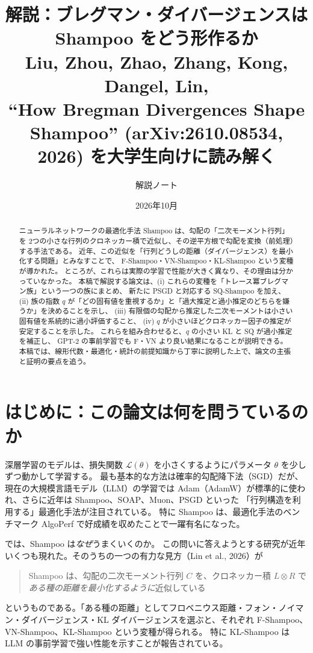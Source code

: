 \documentclass[a4paper,11pt]{ltjsarticle}
\title{\textbf{解説：ブレグマン・ダイバージェンスは Shampoo をどう形作るか}\\[2mm]
\large Liu, Zhou, Zhao, Zhang, Kong, Dangel, Lin,\\
``How Bregman Divergences Shape Shampoo'' (arXiv:2610.08534, 2026) を大学生向けに読み解く}
\author{解説ノート}
\date{2026年10月}
\theoremstyle{definition}
\theoremstyle{plain}
\begin{document}
\maketitle

\begin{abstract}
ニューラルネットワークの最適化手法 Shampoo は、勾配の「二次モーメント行列」を
2つの小さな行列のクロネッカー積で近似し、その逆平方根で勾配を変換（前処理）する手法である。
近年、この近似を「行列どうしの距離（ダイバージェンス）を最小化する問題」とみなすことで、
F-Shampoo・VN-Shampoo・KL-Shampoo という変種が導かれた。
ところが、これらは実際の学習で性能が大きく異なり、その理由は分かっていなかった。
本稿で解説する論文は、(i) これらの変種を「トレース冪ブレグマン族」という一つの族にまとめ、
新たに PSGD と対応する SQ-Shampoo を加え、
(ii) 族の指数 $q$ が「どの固有値を重視するか」と「過大推定と過小推定のどちらを嫌うか」を決めることを示し、
(iii) 有限個の勾配から推定した二次モーメントは小さい固有値を系統的に過小評価すること、
(iv) $q$ が小さいほどクロネッカー因子の推定が安定することを示した。
これらを組み合わせると、$q$ の小さい KL と SQ が過小推定を補正し、
GPT-2 の事前学習でも F・VN より良い結果になることが説明できる。
本稿では、線形代数・最適化・統計の前提知識から丁寧に説明した上で、論文の主張と証明の要点を追う。
\end{abstract}

\tableofcontents
\clearpage

\section{はじめに：この論文は何を問うているのか}

深層学習のモデルは、損失関数 $\mathcal{L}(\theta)$ を小さくするようにパラメータ $\theta$ を少しずつ動かして学習する。
最も基本的な方法は確率的勾配降下法（SGD）だが、現在の大規模言語モデル（LLM）の学習では
Adam（AdamW）が標準的に使われ、さらに近年は Shampoo、SOAP、Muon、PSGD といった
「行列構造を利用する」最適化手法が注目されている。
特に Shampoo は、最適化手法のベンチマーク AlgoPerf で好成績を収めたことで一躍有名になった。

では、Shampoo は\emph{なぜ}うまくいくのか。
この問いに答えようとする研究が近年いくつも現れた。そのうちの一つの有力な見方（Lin et al., 2026）が
\begin{quote}
Shampoo は、勾配の二次モーメント行列 $C$ を、クロネッカー積 $L\otimes R$ で
\emph{ある種の距離を最小化するように}近似している
\end{quote}
というものである。「ある種の距離」としてフロベニウス距離・フォン・ノイマン・ダイバージェンス・KL ダイバージェンスを選ぶと、それぞれ
F-Shampoo、VN-Shampoo、KL-Shampoo という変種が得られる。
特に KL-Shampoo は LLM の事前学習で強い性能を示すことが報告されている。
\end{document}
